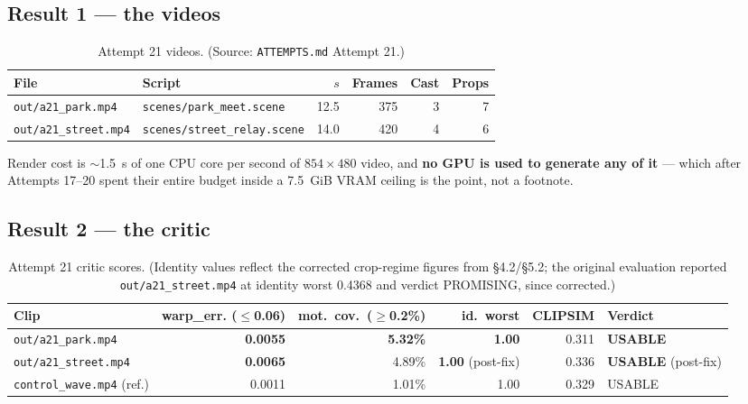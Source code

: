 \documentclass[11pt]{article}
\newcommand{\secsym}{\S}
\begin{document}
\subsection{Result 1 --- the videos}
\label{sec:a21result1}

\begin{table}[h]
\centering
\caption{Attempt 21 videos. (Source: \texttt{ATTEMPTS.md} Attempt 21.)}
\label{tab:a21videos}
\begin{tabular}{@{}L{4cm}L{3.5cm}rrrr@{}}
\toprule
File & Script & $s$ & Frames & Cast & Props \\
\midrule
\texttt{out/a21\_park.mp4} & \texttt{scenes/park\_meet.scene} & 12.5 & 375 & 3 & 7 \\
\texttt{out/a21\_street.mp4} & \texttt{scenes/street\_relay.scene} & 14.0 & 420 & 4 & 6 \\
\bottomrule
\end{tabular}
\end{table}

Render cost is $\sim$1.5~s of one CPU core per second of $854\times480$
video, and \textbf{no GPU is used to generate any of it} --- which after
Attempts 17--20 spent their entire budget inside a 7.5~GiB VRAM ceiling is
the point, not a footnote.

\subsection{Result 2 --- the critic}
\label{sec:a21result2}

\begin{table}[h]
\centering
\caption{Attempt 21 critic scores. (Identity values reflect the corrected
crop-regime figures from \secsym4.2/\secsym5.2; the original evaluation
reported \texttt{out/a21\_street.mp4} at identity worst 0.4368 and verdict
PROMISING, since corrected.)}
\label{tab:a21critic}
\begin{tabular}{@{}L{5cm}rrrrl@{}}
\toprule
Clip & warp\_err. ($\leq$0.06) & mot.\ cov.\ ($\geq$0.2\%) & id.\ worst & CLIPSIM & Verdict \\
\midrule
\texttt{out/a21\_park.mp4} & \textbf{0.0055} & \textbf{5.32\%} & \textbf{1.00} & 0.311 & \textbf{USABLE} \\
\texttt{out/a21\_street.mp4} & \textbf{0.0065} & 4.89\% & \textbf{1.00} (post-fix) & 0.336 & \textbf{USABLE} (post-fix) \\
\texttt{control\_wave.mp4} (ref.) & 0.0011 & 1.01\% & 1.00 & 0.329 & USABLE \\
\bottomrule
\end{tabular}
\end{table}
\end{document}
